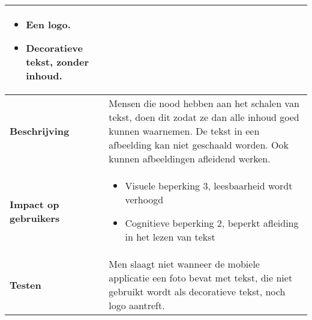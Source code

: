 \begin{table}[H]
\begin{tabular}{|l|p{12cm}|}
        \begin{itemize}
            \item Een logo.
            \item Decoratieve tekst, zonder inhoud.
        \end{itemize}                                                                                                                                                                                                   \\ 
        \hline
        \textbf{Beschrijving}                 & Mensen die nood hebben aan het schalen van tekst, doen dit zodat ze dan alle inhoud goed kunnen waarnemen. De tekst in een afbeelding kan niet geschaald worden. Ook kunnen afbeeldingen afleidend werken.\\ 
        \hline
        \textbf{Impact op gebruikers}         &  
        \begin{itemize}
            \item Visuele beperking 3, leesbaarheid wordt verhoogd 
            \item Cognitieve beperking 2, beperkt afleiding in het lezen van tekst
        \end{itemize}                                                                                                                                                                                                                       \\ 
        \hline
        \textbf{Testen}                       & Men slaagt niet wanneer de mobiele applicatie een foto bevat met tekst, die niet gebruikt wordt als decoratieve tekst, noch logo aantreft.                                                                                                                                                                                  \\
        \hline
    \end{tabular}
\end{table}

